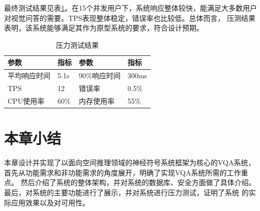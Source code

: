 最终测试结果见表\ref{tab:test_result}。在15个并发用户下，系统响应整体较快，能满足大多数用户对视觉问答的需要。TPS表现整体稳定，错误率也比较低。总体而言，
压测结果表明，该系统能够满足其作为原型系统的要求，符合设计预期。
\begin{table}[htbp]
    \centering
    \renewcommand{\arraystretch}{1.3} %
    \begin{tabular}{|l|l|l|l|}
        \hline
        \textbf{参数} & \textbf{指标} & \textbf{参数} & \textbf{指标} \\
        \hline
        平均响应时间 & 5.1s & 90\%响应时间 & 300ms \\
        \hline
        TPS & 12 & 错误率 & 0.5\% \\
        \hline
        CPU使用率 & 60\% & 内存使用率 & 55\% \\
        \hline
    \end{tabular}
    \label{tab:test_result}
    \caption{压力测试结果}
\end{table}
\section{本章小结}
本章设计并实现了以面向空间推理领域的神经符号系统框架为核心的VQA系统，首先从功能需求和非功能需求的角度展开，明确了实现VQA系统所需的工作重点。
然后介绍了系统的整体架构，并对系统的数据库、安全方面做了具体介绍。最后，对系统的主要功能进行了展示，并对系统进行压力测试，证明了系统
的实际应用效果以及对可用性。